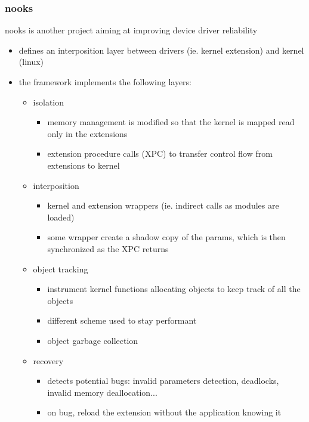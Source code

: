 \begin{frame}
 \frametitle{nooks}
 nooks is another project aiming at improving device driver reliability

 \begin{itemize}
   \item defines an interposition layer between drivers (ie. kernel extension) and kernel (linux)
   \item the framework implements the following layers:

   \begin{itemize}

     \item isolation
     \begin{itemize}
       \item memory management is modified so that the kernel is mapped read only in the extensions
       \item extension procedure calls (XPC) to transfer control flow from extensions to kernel
     \end{itemize}

     \item interposition
     \begin{itemize}
       \item kernel and extension wrappers (ie. indirect calls as modules are loaded)
       \item some wrapper create a shadow copy of the params, which is then synchronized as the XPC returns
     \end{itemize}

     \item object tracking
     \begin{itemize}
       \item instrument kernel functions allocating objects to keep track of all the objects
       \item different scheme used to stay performant
       \item object garbage collection
     \end{itemize}

     \item recovery
     \begin{itemize}
       \item detects potential bugs: invalid parameters detection, deadlocks, invalid memory deallocation...
       \item on bug, reload the extension without the application knowing it
     \end{itemize}

    \end{itemize}
  \end{itemize}
\end{frame}


